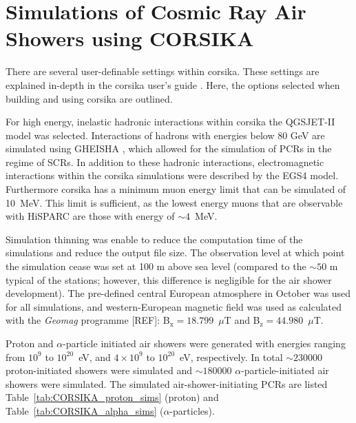\chapter{Simulations of Cosmic Ray Air Showers using CORSIKA}\label{app:CORSIKA_sims}


There are several user-definable settings within \gls{corsika}. These settings are explained in-depth in the \gls{corsika} user's guide \citep{heck_extensive_2017}. Here, the options selected when building and using \gls{corsika} are outlined.

For high energy, inelastic hadronic interactions within \gls{corsika} the QGSJET-II \citep{ostapchenko_qgsjet-ii_2006} model was selected. Interactions of hadrons with energies below 80 GeV are simulated using GHEISHA \citep{fesefeldt_gheisha._1985}, which allowed for the simulation of PCRs in the regime of SCRs. In addition to these hadronic interactions, electromagnetic interactions within the \gls{corsika} simulations were described by the EGS4 \citep{nelson_egs4_1985} model. Furthermore \gls{corsika} has a minimum muon energy limit that can be simulated of 10~MeV. This limit is sufficient, as the lowest energy muons that are observable with HiSPARC are those with energy of $\sim 4$~MeV.

Simulation thinning was enable to reduce the computation time of the simulations and reduce the output file size. The observation level at which point the simulation cease was set at 100 m above sea level (compared to the $\sim 50$ m typical of the stations; however, this difference is negligible for the air shower development). The pre-defined central European atmosphere in October was used for all simulations, and western-European magnetic field was used as calculated with the \textit{Geomag} programme [REF]: B$_{\mathrm{x}}=18.799$~$\mu$T and B$_{\mathrm{z}}=44.980$~$\mu$T.

Proton and $\alpha$-particle initiated air showers were generated with energies ranging from $10^{9}$ to $10^{20}$~eV, and $4\times10^{9}$ to $10^{20}$~eV, respectively. In total $\sim 230000$ proton-initiated showers were simulated and $\sim 180000$ $\alpha$-particle-initiated air showers were simulated. The simulated air-shower-initiating PCRs are listed Table~\ref{tab:CORSIKA_proton_sims} (proton) and Table~\ref{tab:CORSIKA_alpha_sims} ($\alpha$-particles).

